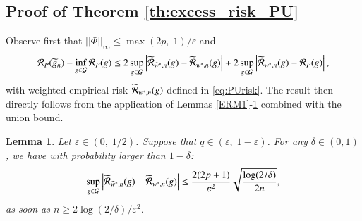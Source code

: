 \documentclass[12pt]{article}
\newtheorem{lemma}{{\bf Lemma}}
\newcommand{\cR}{{\cal R}}
\begin{document}
\subsection*{Proof of Theorem \ref{th:excess_risk_PU} }
Observe first that $\vert\vert \Phi \vert\vert_{\infty}\leq \max(2p,\; 1)/\varepsilon$ and
$$
\cR_P(\widetilde{g}_n)-\inf_{g\in\mathcal{G}}\cR_P(g)\leq 2\sup_{g\in \mathcal{G}}\left\vert  \widetilde{\cR}_{\widehat{w}^*,n}(g)-    \widetilde{\cR}_{w^*,n}(g) \right\vert + 2\sup_{g\in \mathcal{G}}\left\vert  \widetilde{\cR}_{w^*,n}(g)-    \cR_{P}(g) \right\vert,
$$
with weighted empirical risk $\widetilde{\cR}_{w^*,n}(g)$ defined in \eqref{eq:PUrisk}.
The result then directly follows from the application of Lemmas \ref{ERM1}-\ref{lem:approx3} combined with the union bound.

\begin{lemma}\label{lem:approx3}
Let $\varepsilon\in(0,\; 1/2)$. Suppose that $q\in (\varepsilon,\; 1-\varepsilon)$. For any $\delta\in (0,1)$, we have with probability larger than $1-\delta$:
$$
\sup_{g\in \mathcal{G}}\left\vert  \widetilde{\cR}_{\widehat{w}^*,n}(g)-    \widetilde{\cR}_{w^*,n}(g) \right\vert
\leq \frac{2(2p+1)}{\varepsilon^2} \sqrt{\frac{\log (2/\delta)}{2n}},
$$
as soon as $n\geq 2\log(2/\delta)/\varepsilon^2$.
\end{lemma}
\end{document}
